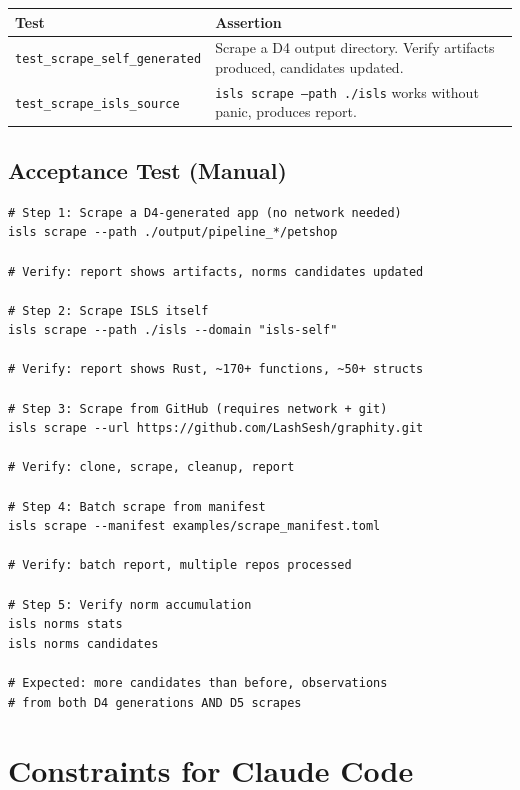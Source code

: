 \documentclass[11pt,a4paper]{article}
\begin{document}
\begin{longtable}{lp{10cm}}
\toprule
\textbf{Test} & \textbf{Assertion} \\
\midrule
\texttt{test\_scrape\_self\_generated}
  & Scrape a D4 output directory. Verify artifacts produced,
    candidates updated. \\
\texttt{test\_scrape\_isls\_source}
  & \texttt{isls scrape --path ./isls} works without panic,
    produces report. \\
\bottomrule
\end{longtable}

\subsection{Acceptance Test (Manual)}

\begin{lstlisting}[style=bash]
# Step 1: Scrape a D4-generated app (no network needed)
isls scrape --path ./output/pipeline_*/petshop

# Verify: report shows artifacts, norms candidates updated

# Step 2: Scrape ISLS itself
isls scrape --path ./isls --domain "isls-self"

# Verify: report shows Rust, ~170+ functions, ~50+ structs

# Step 3: Scrape from GitHub (requires network + git)
isls scrape --url https://github.com/LashSesh/graphity.git

# Verify: clone, scrape, cleanup, report

# Step 4: Batch scrape from manifest
isls scrape --manifest examples/scrape_manifest.toml

# Verify: batch report, multiple repos processed

# Step 5: Verify norm accumulation
isls norms stats
isls norms candidates

# Expected: more candidates than before, observations
# from both D4 generations AND D5 scrapes
\end{lstlisting}


\section{Constraints for Claude Code}
\end{document}
